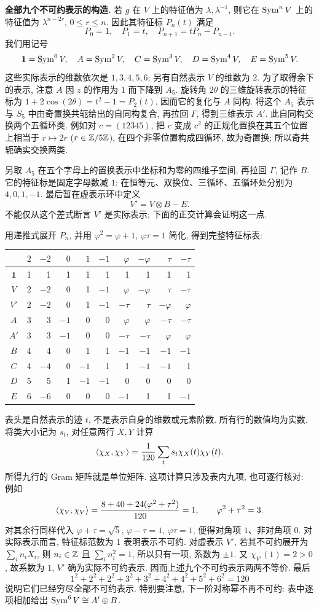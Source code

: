 \begin{solution}
\textbf{全部九个不可约表示的构造.}
若 $g$ 在 $V$ 上的特征值为 $\lambda,\lambda^{-1}$, 则它在 $\operatorname{Sym}^nV$ 上的特征值为 $\lambda^{n-2r}$, $0\le r\le n$. 因此其特征标 $P_n(t)$ 满足
\[
 P_0=1,\quad P_1=t,\quad P_{n+1}=tP_n-P_{n-1}.
\]
我们用记号
\[
 \mathbf1=\operatorname{Sym}^0V,\quad A=\operatorname{Sym}^2V,\quad C=\operatorname{Sym}^3V,
 \quad D=\operatorname{Sym}^4V,\quad E=\operatorname{Sym}^5V.
\]
这些实际表示的维数依次是 $1,3,4,5,6$; 另有自然表示 $V$ 的维数为 $2$. 为了取得余下的表示, 注意 $A$ 因 $z$ 的作用为 $1$ 而下降到 $A_5$. 旋转角 $2\theta$ 的三维旋转表示的特征标为 $1+2\cos(2\theta)=t^2-1=P_2(t)$, 因而它的复化与 $A$ 同构. 将这个 $A_5$ 表示与 $S_5$ 中由奇置换共轭给出的自同构复合, 再拉回 $\Gamma$, 得到三维表示 $A'$. 此自同构交换两个五循环类. 例如对 $c=(12345)$, 把 $c$ 变成 $c^2$ 的正规化置换在其五个位置上相当于 $r\mapsto2r$ ($r\in\mathbb Z/5\mathbb Z$), 在四个非零位置构成四循环, 故为奇置换; 所以奇共轭确实交换两类.

另取 $A_5$ 在五个字母上的置换表示中坐标和为零的四维子空间, 再拉回 $\Gamma$, 记作 $B$. 它的特征标是固定字母数减 $1$: 在恒等元、双换位、三循环、五循环处分别为 $4,0,1,-1$. 最后暂在虚表示环中定义
\[
 V'=V\otimes B-E.
\]
不能仅从这个差式断言 $V'$ 是实际表示; 下面的正交计算会证明这一点.

用递推式展开 $P_n$, 并用 $\varphi^2=\varphi+1$, $\varphi\tau=1$ 简化, 得到完整特征标表:
\begin{center}
\begin{tabular}{c|rrrrrrrrr}
\toprule
 & $2$&$-2$&$0$&$1$&$-1$&$\varphi$&$-\varphi$&$\tau$&$-\tau$\\
\midrule
$\mathbf1$&1&1&1&1&1&1&1&1&1\\
$V$&2&$-2$&0&1&$-1$&$\varphi$&$-\varphi$&$\tau$&$-\tau$\\
$V'$&2&$-2$&0&1&$-1$&$-\tau$&$\tau$&$-\varphi$&$\varphi$\\
$A$&3&3&$-1$&0&0&$\varphi$&$\varphi$&$-\tau$&$-\tau$\\
$A'$&3&3&$-1$&0&0&$-\tau$&$-\tau$&$\varphi$&$\varphi$\\
$B$&4&4&0&1&1&$-1$&$-1$&$-1$&$-1$\\
$C$&4&$-4$&0&$-1$&1&1&$-1$&$-1$&1\\
$D$&5&5&1&$-1$&$-1$&0&0&0&0\\
$E$&6&$-6$&0&0&0&$-1$&1&1&$-1$\\
\bottomrule
\end{tabular}
\end{center}
表头是自然表示的迹 $t$, 不是表示自身的维数或元素阶数. 所有行的数值均为实数. 将类大小记为 $s_t$, 对任意两行 $X,Y$ 计算
\[
 \langle \chi_X,\chi_Y\rangle
 =\frac1{120}\sum_t s_t\chi_X(t)\chi_Y(t).
\]
所得九行的 Gram 矩阵就是单位矩阵. 这项计算只涉及表内九项, 也可逐行核对: 例如
\[
 \langle \chi_V,\chi_V\rangle
 =\frac{8+40+24(\varphi^2+\tau^2)}{120}=1,
 \qquad \varphi^2+\tau^2=3.
\]
对其余行同样代入 $\varphi+\tau=\sqrt5$, $\varphi-\tau=1$, $\varphi\tau=1$, 便得对角项 $1$、非对角项 $0$. 对实际表示而言, 特征标范数为 $1$ 表明表示不可约. 对虚表示 $V'$, 若其不可约展开为 $\sum_i n_iX_i$, 则 $n_i\in\mathbb Z$ 且 $\sum_i n_i^2=1$, 所以只有一项, 系数为 $\pm1$. 又 $\chi_{V'}(1)=2>0$, 故系数为 $1$, $V'$ 确为实际不可约表示. 因而上述九个不可约表示两两不等价. 最后
\[
 1^2+2^2+2^2+3^2+3^2+4^2+4^2+5^2+6^2=120
\]
说明它们已经穷尽全部不可约表示. 特别要注意, 下一阶对称幂不再不可约: 表中逐项相加给出 $\operatorname{Sym}^6V\cong A'\oplus B$.


\end{solution}

